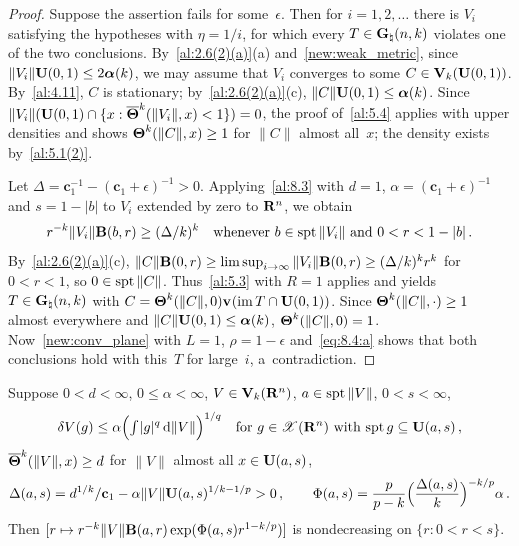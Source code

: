 \begin{proof}
    Suppose the assertion fails for some~$\epsilon$. Then for $i = 1, 2, \ldots$ there is $V_i$
    satisfying the hypotheses with $\eta = 1/i$, for which every $T \in \mathbf{G}_{\natural}(n,k)$
    violates one of the two conclusions. By~\ref{al:2.6(2)(a)}(a) and~\ref{new:weak_metric}, since
    $\|V_i\| \mathbf{U}(0,1) \le 2 \boldsymbol{\alpha}(k)$, we may assume that $V_i$ converges to some $C
    \in \mathbf{V}_{k}(\mathbf{U}(0,1))$. By~\ref{al:4.11}, $C$ is stationary; by~\ref{al:2.6(2)(a)}(c),
    $\|C\| \mathbf{U}(0,1) \le \boldsymbol{\alpha}(k)$. Since $\|V_i\|(\mathbf{U}(0,1) \cap \{ x :
    \boldsymbol{\overline{\Theta}}^{k}(\|V_i\|,x) < 1 \}) = 0$, the proof of~\ref{al:5.4} applies with upper
    densities and shows $\boldsymbol{\Theta}^{k}(\|C\|,x) \ge 1$ for $\|C\|$ almost all~$x$; the density
    exists by~\ref{al:5.1(2)}.

    Let $\Delta = \mathbf{c}_1^{-1} - (\mathbf{c}_1 + \epsilon)^{-1} > 0$. Applying~\ref{al:8.3} with
    $d = 1$, $\alpha = (\mathbf{c}_1 + \epsilon)^{-1}$ and $s = 1 - |b|$ to $V_i$ extended by zero to
    $\mathbf{R}^{n}$, we obtain
    \begin{equation}
        \label{eq:8.4:a}
        r^{-k} \|V_i\| \mathbf{B}(b,r) \ge (\Delta/k)^{k} \quad \text{whenever $b \in \operatorname{spt}
        \|V_i\|$ and $0 < r < 1 - |b|$} \,.
    \end{equation}
    By~\ref{al:2.6(2)(a)}(c), $\|C\| \mathbf{B}(0,r) \ge \limsup_{i \to \infty} \|V_i\| \mathbf{B}(0,r)
    \ge (\Delta/k)^{k} r^{k}$ for $0 < r < 1$, so $0 \in \operatorname{spt} \|C\|$. Thus~\ref{al:5.3}
    with $R = 1$ applies and yields $T \in \mathbf{G}_{\natural}(n,k)$ with $C = \boldsymbol{\Theta}^{k}(\|C\|,0)
    \mathbf{v}_{}(\operatorname{im} T \cap \mathbf{U}(0,1))$. Since $\boldsymbol{\Theta}^{k}(\|C\|,\cdot) \ge 1$ almost everywhere
    and $\|C\| \mathbf{U}(0,1) \le \boldsymbol{\alpha}(k)$, $\boldsymbol{\Theta}^{k}(\|C\|,0) = 1$.
    Now~\ref{new:conv_plane} with $L = 1$, $\rho = 1 - \epsilon$ and~\eqref{eq:8.4:a} shows that
    both conclusions hold with this~$T$ for large~$i$, a~contradiction.
\end{proof}

\begin{theorem}
    \label{al:8.5}
    Suppose $0 < d < \infty$, $0 \le \alpha < \infty$, $V \in \mathbf{V}_{k}(\mathbf{R}^{n})$, $a \in \operatorname{spt}
    \|V\|$, $0 < s < \infty$,
    \begin{displaymath}
        \delta V(g) \le \alpha \Big( {\textstyle\int_{}^{}} |g|^q \,\mathrm{d} \|V\| \Big)^{1/q} \quad \text{for $g \in
        \mathscr{X}(\mathbf{R}^{n})$ with $\operatorname{spt} g \subseteq \mathbf{U}(a,s)$} \,,
    \end{displaymath}
    $\boldsymbol{\overline{\Theta}}^{k}(\|V\|,x) \ge d$ for $\|V\|$ almost all $x \in \mathbf{U}(a,s)$,
    \begin{displaymath}
        \Delta(a,s) = d^{1/k} / \mathbf{c}_1 - \alpha \|V\| \mathbf{U}(a,s)^{1/k - 1/p} > 0
        \,, \qquad \Phi(a,s) = \frac{p}{p - k} \Big( \frac{\Delta(a,s)}{k} \Big)^{-k/p}
        \alpha \,.
    \end{displaymath}
    Then $[r \mapsto r^{-k} \|V\| \mathbf{B}(a,r) \exp(\Phi(a,s) r^{1 - k/p})]$ is
    nondecreasing on $\{ r : 0 < r < s \}$.
\end{theorem}


